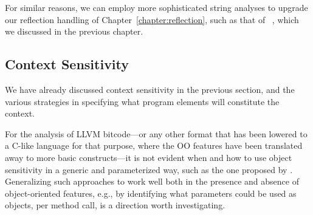 For similar reasons, we can employ more sophisticated string analyses
to upgrade our reflection handling of
Chapter~\ref{chapter:reflection}, such as that of
\citeauthor*{sas/ChristensenMS03}~\cite{sas/ChristensenMS03}, which we
discussed in the previous chapter.


\subsection{Context Sensitivity}

We have already discussed context sensitivity in the previous section,
and the various strategies in specifying what program elements will
constitute the context.

For the analysis of LLVM bitcode---or any other format that has been
lowered to a C-like language for that purpose, where the OO features
have been translated away to more basic constructs---it is not evident
when and how to use object sensitivity in a generic and parameterized
way, such as the one proposed by \citeauthor*{popl/SmaragdakisBL11}
\cite{popl/SmaragdakisBL11}. Generalizing such approaches to work well
both in the presence and absence of object-oriented features, e.g., by
identifying what parameters could be used as objects, per method call,
is a direction worth investigating.



